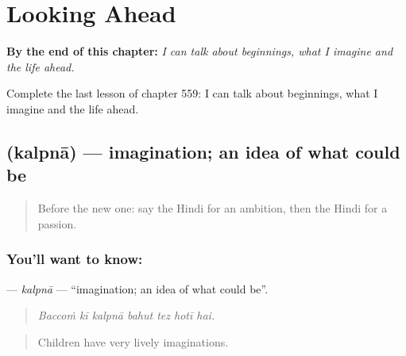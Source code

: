 
\chapter{Looking Ahead}
\label{ch:hi-looking-ahead}

\begin{chapteropening}
\textbf{By the end of this chapter:} \emph{I can talk about beginnings, what I imagine and the life ahead.}

Complete the last lesson of chapter 559: I can talk about beginnings, what I imagine and the life ahead.
\end{chapteropening}

\section[\texorpdfstring{\hi{कल्पना} (kalpnā)}{कल्पना (kalpnā)}]{ (kalpnā) — imagination; an idea of what could be}

\label{lesson:HI-C559-kalpna}



\begin{quote}
Before the new one: say the Hindi for an ambition, then the Hindi for a passion.
\end{quote}

\subsection*{You'll want to know: }
\textbf{} — \emph{kalpnā} — \textquotedblleft{}imagination; an idea of what could be\textquotedblright{}.

\begin{quote}
      
\end{quote}

\begin{quote}
\emph{Baccoṁ kī kalpnā bahut tez hotī hai.}
\end{quote}

\begin{quote}
Children have very lively imaginations.
\end{quote}

